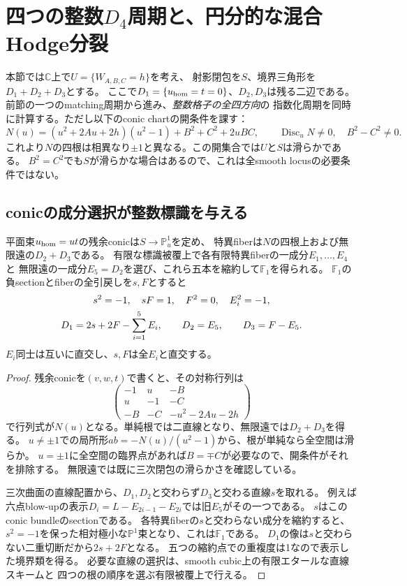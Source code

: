\section{四つの整数\texorpdfstring{$D_4$}{D4}周期と、円分的な混合Hodge分裂}
\label{sec:four-D4-periods}
本節では$\mathbb C$上で$U=\{W_{A,B,C}=h\}$を考え、
射影閉包を$S$、境界三角形を$D_1+D_2+D_3$とする。
ここで$D_1=\{u_{\rm hom}=t=0\}$、$D_2,D_3$は残る二辺である。
前節の一つのmatching周期から進み、\emph{整数格子の全四方向}の
指数化周期を同時に計算する。ただし以下のconic chartの開条件を課す：
\begin{equation}\label{eq:four-period-open}
 N(u)=(u^2+2Au+2h)(u^2-1)+B^2+C^2+2uBC,
 \qquad \operatorname{Disc}_uN\ne0,\quad B^2-C^2\ne0.
\end{equation}
これより$N$の四根は相異なり$\pm1$と異なる。この開集合では$U$と$S$は滑らかである。
$B^2=C^2$でも$S$が滑らかな場合はあるので、これは全smooth locusの必要条件ではない。

\subsection{conicの成分選択が整数標識を与える}
\begin{lemma}
\label{lem:conic-F1-marking}
平面束$u_{\rm hom}=ut$の残余conicは$S\to\mathbb P^1_u$を定め、
特異fiberは$N$の四根上および無限遠の$D_2+D_3$である。
有限な標識被覆上で各有限特異fiberの一成分$E_1,\ldots,E_4$と
無限遠の一成分$E_5=D_2$を選び、これら五本を縮約して$\mathbb F_1$を得られる。
$\mathbb F_1$の負sectionとfiberの全引戻しを$s,F$とすると
\begin{gather}\label{eq:F1-boundary-classes}
 s^2=-1,\quad sF=1,\quad F^2=0,\quad E_i^2=-1,\notag\\
 D_1=2s+2F-\sum_{i=1}^5 E_i,\qquad
 D_2=E_5,\qquad D_3=F-E_5.
\end{gather}
$E_i$同士は互いに直交し、$s,F$は全$E_i$と直交する。
\end{lemma}
\begin{proof}
残余conicを$(v,w,t)$で書くと、その対称行列は
\[
 \begin{pmatrix}-1&u&-B\\u&-1&-C\\-B&-C&-u^2-2Au-2h\end{pmatrix}
\]
で行列式が$N(u)$となる。単純根では二直線となり、無限遠では$D_2+D_3$を得る。
$u\ne\pm1$での局所形$ab=-N(u)/(u^2-1)$から、根が単純なら全空間は滑らか。
$u=\pm1$に全空間の臨界点があれば$B=\mp C$が必要なので、開条件がそれを排除する。
無限遠では既に三次閉包の滑らかさを確認している。

三次曲面の直線配置から、$D_1,D_2$と交わらず$D_3$と交わる直線$s$を取れる。
例えば六点blow-upの表示$D_i=L-E_{2i-1}-E_{2i}$では旧$E_5$がその一つである。
$s$はこのconic bundleのsectionである。
各特異fiberの$s$と交わらない成分を縮約すると、
$s^2=-1$を保った相対極小な$\mathbb P^1$束となり、これは$\mathbb F_1$である。
$D_1$の像は$s$と交わらない二重切断だから$2s+2F$となる。
五つの縮約点での重複度は1なので表示した境界類を得る。
必要な直線の選択は、smooth cubic上の有限エタールな直線スキームと
四つの根の順序を選ぶ有限被覆上で行える。
\end{proof}

